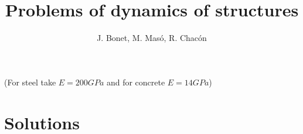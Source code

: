 \documentclass{problems}
\title{Problems of dynamics of structures}
\author{J. Bonet, M. Masó, R. Chacón}
\begin{document}
\maketitle

(For steel take $E=200GPa$ and for concrete $E=14GPa$)





\newpage
\section{Solutions}




\end{document}
